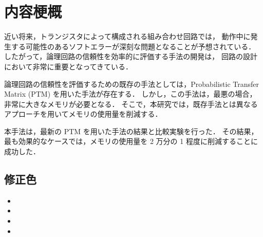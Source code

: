 \chapter*{内容梗概}


近い将来，トランジスタによって構成される組み合わせ回路では，
動作中に発生する可能性のあるソフトエラーが深刻な問題となることが予想されている．
したがって，論理回路の信頼性を効率的に評価する手法の開発は，
回路の設計において非常に重要となってきている．

論理回路の信頼性を評価するための既存の手法としては，Probabilistic Transfer Matrix (PTM) を用いた手法が存在する．
しかし，この手法は，最悪の場合，非常に大きなメモリが必要となる．
そこで，本研究では，既存手法とは異なるアプローチを用いてメモリの使用量を削減する．

本手法は，最新の PTM を用いた手法の結果と比較実験を行った．
その結果，最も効果的なケースでは，メモリの使用量を 2 万分の 1 程度に削減することに成功した．

\ifnum{}
\section*{修正色}

\begin{itemize}
  \item {}
  \item {}
  \item {}
  \item {}
\end{itemize}
\fi
